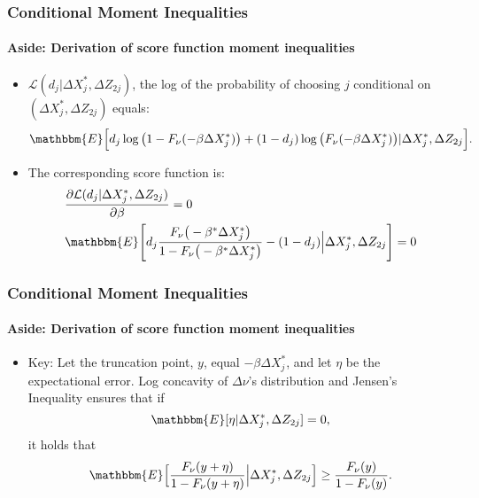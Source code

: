 \begin{frame}
\frametitle{Conditional Moment Inequalities} \framesubtitle{Aside:
Derivation of score function moment inequalities}

\begin{itemize}
\item $\mathcal{L}(d_{j}|\Delta X^{*}_{j},\Delta Z_{2j})$, the log of the
probability of choosing $j$ conditional on $(\Delta X_{j}^{*},\Delta Z_{2j})$
equals:  
\begin{equation*}
\mathbbm{E}\Big[d_{j}\log\big(1-F_{\nu}(-\beta\Delta X^{*}_{j})\big)%
+(1-d_{j})\log\big(F_{\nu}(-\beta\Delta X^{*}_{j})\big)|\Delta
X_{j}^{*},\Delta Z_{2j}\Big].
\end{equation*}

\item The corresponding score function is:  
\begin{eqnarray*}
&\frac{\partial\mathcal{L}(d_{j}|\Delta X_{j}^{*},\Delta Z_{2j})}{%
\partial\beta}=0 \\
&\mathbbm{E}\Bigg[d_{j}\frac{F_{\nu}\big(-\beta^{*} \Delta X^{*}_{j}\big)}{%
1-F_{\nu}\big(-\beta^{*} \Delta X^{*}_{j}\big)}-(1-d_{j})\Big|\Delta
X_{j}^{*},\Delta Z_{2j}\Bigg]=0
\end{eqnarray*}
\end{itemize}
\end{frame}


\begin{frame}
\frametitle{Conditional Moment Inequalities} \framesubtitle{Aside:
Derivation of score function moment inequalities}

\begin{itemize}
\item Key: Let the truncation point, $y$, equal $-\beta \Delta X_{j}^{*}$,
and let $\eta$ be the expectational error. Log concavity of $\Delta \nu$'s
distribution and Jensen's Inequality ensures that if  
\begin{equation*}
\mathbbm{E}[\eta|\Delta X_{j}^{*},\Delta Z_{2j}]=0,
\end{equation*}
it holds that  
\begin{equation*}
\mathbbm{E}\Big[\frac{F_{\nu}(y+\eta)}{1-F_{\nu}(y+\eta)}\Big|\Delta
X_{j}^{*},\Delta Z_{2j}\Big]\geq\frac{F_{\nu}(y)}{1-F_{\nu}(y)}.
\end{equation*}
\end{itemize}
\end{frame}

